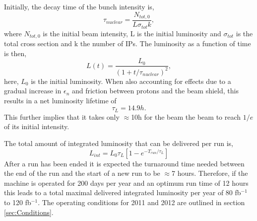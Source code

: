 Initially, the decay time of the bunch intensity is,
\begin{equation}
\tau_{nuclear}=\frac{N_{tot,0}}{L\sigma_{tot}k},
\end{equation}
where $N_{tot,0}$ is the initial beam intensity, L is the initial
luminosity and $\sigma_{tot}$ is the total cross section and 
k the number of IPs.
The luminosity as a function of time is then,
\begin{equation}
L(t)=\frac{L_{0}}{(1+t/\tau_{nuclear})^{2}},
\end{equation}
here, $L_{0}$ is the initial luminosity.
When also accounting for effects due to a gradual increase in
 $\epsilon_{n}$ and friction between protons and the 
 beam shield, this results in a net luminosity lifetime of 
\begin{equation}
\tau_{L} = 14.9 h .
\end{equation}
This further implies that it takes only $\approx$10h for the
beam the beam to reach $1/e$ of its initial intensity.

The total amount of integrated luminosity that can be delivered
per run is,
\begin{equation}
L_{int}=L_{0}\tau_{L}\left[ 1-e^{-T_{run}/\tau_{L}}\right]
\end{equation}
After a run has been ended it is expected the turnaround time
needed between the end of the run and the start of a new run
to be $\approx$7 hours. Therefore, if the machine is operated for 200 days
per year and an optimum run time of 12 hours this leads to a 
total maximal delivered integrated luminosity per year of 80 fb$^{-1}$
to 120 fb$^{-1}$. The operating conditions for 2011 and 2012
are outlined in section \ref{sec:Conditions}.

